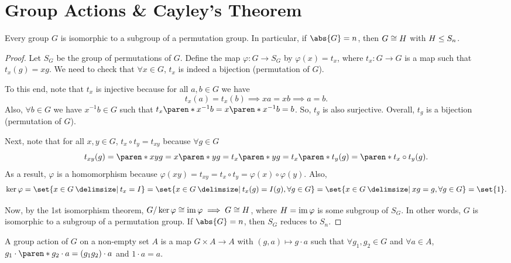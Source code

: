 \documentclass[11pt]{penrose}
\begin{document}
\section{Group Actions \& Cayley's Theorem}
\begin{nthm}
    Every group $G$ is isomorphic to a subgroup of a permutation group. In particular, if $\abs{G} = n$, then $G \mathrel{\cong} H$ with $H \mathrel{\leq} S_{n}$.
\end{nthm}
\begin{proof}
    Let $S_{G}$ be the group of permutations of $G$. Define the map $\varphi : G \to S_{G}$ by $\varphi(x) = t_{x}$, where $t_{x} : G \to G$ is a map such that $t_{x}(g) = xg$. We need to check that $\forall x \in G$, $t_{x}$ is indeed a bijection (permutation of $G$).

    To this end, note that $t_{x}$ is injective because for all $a, b \in G$ we have
    \begin{equation*}
        t_{x}(a) = t_{x}(b) \implies xa = xb \implies a = b.
    \end{equation*}
    Also, $\forall b \in G$ we have $x^{-1}b \in G$ such that $t_{x}\paren*{x^{-1} b} = x \paren*{x^{-1} b} = b$. So, $t_{g}$ is also surjective. Overall, $t_{g}$ is a bijection (permutation of $G$).

    Next, note that for all $x, y \in G$, $t_{x} \circ t_{y} = t_{xy}$ because $\forall g \in G$
    \begin{equation*}
        t_{x y}(g)
        = \paren*{x y} g
        = x \paren*{ yg }
        = t_{x} \paren*{ yg }
        = t_{x} \paren*{ t_{y}(g) }
        = \paren*{t_{x} \circ t_{y}} (g).
    \end{equation*}
    As a result, $\varphi$ is a homomorphism because $\varphi(xy) = t_{xy} = t_{x} \circ t_{y} = \varphi(x) \circ \varphi(y)$. Also,
    \begin{align*}
        \ker\varphi
        = \set{x \in G \st t_{x} = I}
        = \set{x \in G \st t_{x}(g) = I(g), \forall g \in G}
        = \set{x \in G \st xg = g, \forall g \in G}
        = \set{1}.
    \end{align*}

    Now, by the 1st isomorphism theorem, $G / \ker\varphi \mathrel{\cong} \operatorname{im}\varphi \implies G \mathrel{\cong} H$,
    where $H = \operatorname{im}\varphi$ is some subgroup of $S_{G}$. In other words, $G$ is isomorphic to a subgroup of a permutation group. If $\abs{G} = n$, then $S_{G}$ reduces to $S_{n}$.
\end{proof}

\begin{ndfn}
    A group action of $G$ on a non-empty set $A$ is a map $G \times A \to A$ with $(g, a) \mapsto g \cdot a$ such that $\forall g_{1}, g_{2} \in G$ and $\forall a \in A$, $g_{1} \cdot \paren*{ g_{2} \cdot a } = (g_{1} g_{2}) \cdot a$ and $1 \cdot a = a$.
\end{ndfn}
\end{document}

